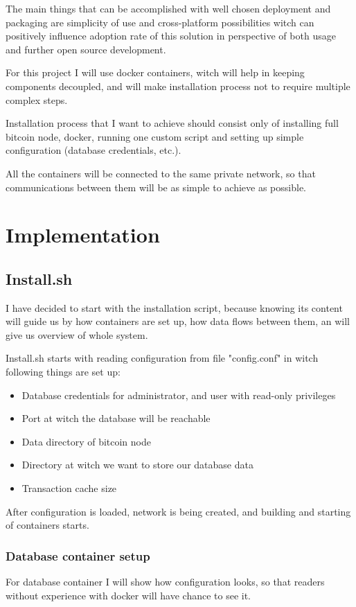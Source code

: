 \documentclass[12pt, en, eng]{mgr}
\begin{document}
The main things that can be accomplished with well chosen deployment and packaging are simplicity of use and cross-platform possibilities witch can positively influence adoption rate of this solution in perspective of both usage and further open source development.

For this project I will use docker containers, witch will help in keeping components decoupled, and will make installation process not to require multiple complex steps. 

Installation process that I want to achieve should consist only of installing full bitcoin node, docker, running one custom script and setting up simple configuration (database credentials, etc.).

All the containers will be connected to the same private network, so that communications between them will be as simple to achieve as possible.

\section{Implementation}

\subsection{Install.sh}
I have decided to start with the installation script, because knowing its content will guide us by how containers are set up, how data flows between them, an will give us overview of whole system.

Install.sh starts with reading configuration from file "config.conf" in witch following things are set up:

\begin{itemize}
\item
Database credentials for administrator, and user with read-only privileges
\item
Port at witch the database will be reachable
\item
Data directory of bitcoin node
\item
Directory at witch we want to store our database data
\item
Transaction cache size
\end{itemize} 

After configuration is loaded, network is being created, and building and starting of containers starts.

\subsubsection{Database container setup}
For database container I will show how configuration looks, so that readers without experience with docker will have chance to see it.
\end{document}
